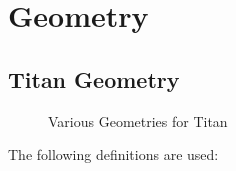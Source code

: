\chapter{Geometry}
    \section{Titan Geometry}
        \begin{figure}[H]
        	\centering
        	\captionsetup{type=figure}
        	\begin{subfigure}[b]{0.49\textwidth}
        	    \centering
        	    \captionsetup{type=figure}
        	    \resizebox{\textwidth}{!}{%
                  
              }
        	    \label{fig:math_titan_geom_vec}
            \end{subfigure}
            \begin{subfigure}[b]{0.49\textwidth}
                \centering
                \captionsetup{type=figure}
                \resizebox{\textwidth}{!}{%
                    
                }
                \label{fig:math_geo_bending_angle}
            \end{subfigure}
            \caption{Various Geometries for Titan}
        \end{figure}
        The following definitions are used:
